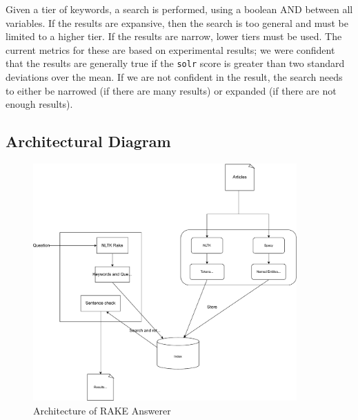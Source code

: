 \documentclass[11pt]{article}
\begin{document}
Given a tier of keywords, a search is performed, using a boolean AND between all variables. If the results are expansive, then the search is too general and must be limited to a higher tier. If the results are narrow, lower tiers must be used. The current metrics for these are based on experimental results; we were confident that the results are generally true if the \texttt{solr} score is greater than two standard deviations over the mean. If we are not confident in the result, the search needs to either be narrowed (if there are many results) or expanded (if there are not enough results).

\subsection{Architectural Diagram}

  \begin{figure}[H]
    \centering
    \includegraphics[width=0.9\textwidth]{fig/rake.pdf}
    \caption{Architecture of RAKE Answerer}
    \label{fig:rake}
  \end{figure}
\end{document}
